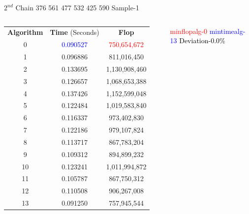\documentclass[10pts]{beamer}
\begin{document}
	   
	    \begin{frame}{$2^{nd}$ Chain 376 561 477 532 425 590 \hspace{75pt}   Sample-1 }
	    	\begin{columns}
	    		
	    		\begin{tabular}{c | c | c}
	    			\textbf{Algorithm}  & \textbf{Time} (Seconds) & \textbf{Flop}\\		
	    			0 &	\textcolor{blue}{0.090527} &	\textcolor{red}{750,654,672}\\ 		
	    			1 &	0.096886 &	811,016,450 \\		
	    			2 &	0.133695 &	1,130,908,460 	\\	
	    			3 &	0.126657 &	1,068,653,388 	\\	
	    			4 &	0.137426 &	1,152,599,048 	\\	
	    			5 &	0.122484 &	1,019,583,840 	\\	
	    			6 &	0.116337 &	973,402,830 	\\	
	    			7 &	0.122186 &	979,107,824 	\\	
	    			8 &	0.113717 &	867,783,204 	\\	
	    			9 &	0.109312 &	894,899,232 	\\	
	    			10 &	0.123241& 	1,011,994,872\\ 		
	    			11 & 0.105787 	&867,750,312 		\\
	    			12 &	0.110508 &	906,267,008 	\\	
	    			13 &	0.091250 &	757,945,544  	\\	
	    		\end{tabular}
	    		
	    		
	    		\textcolor{red}{min\textunderscore flop\textunderscore alg-0}
	    		\textcolor{blue}{min\textunderscore time\textunderscore alg-13}
	    		\textcolor{black}{Deviation-0.0\%}
	    	\end{columns}
	    \end{frame} 
\end{document}
